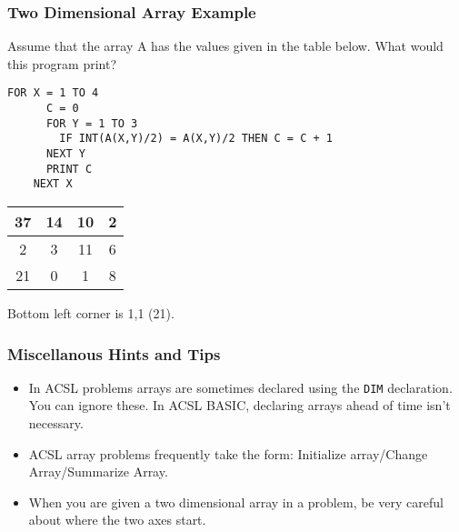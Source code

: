 \documentclass[handout,fleqn, t]{beamer}
\begin{document}
\begin{frame}[fragile]
  \frametitle{Two Dimensional Array Example}

  Assume that the array A has the values given in the table below.  What would
  this program print?

  \begin{lstlisting}[gobble=4]
    FOR X = 1 TO 4
      C = 0
      FOR Y = 1 TO 3
        IF INT(A(X,Y)/2) = A(X,Y)/2 THEN C = C + 1
      NEXT Y
      PRINT C
    NEXT X
  \end{lstlisting}
  \begin{tabular}{|c|c|c|c|}
    \hline 37 & 14 & 10 & 2 \\
    \hline 2 & 3 & 11 & 6 \\
    \hline 21 & 0 & 1 & 8 \\
    \hline
  \end{tabular}

  Bottom left corner is 1,1 (21).
\end{frame}

\begin{frame}
  \frametitle{Miscellanous Hints and Tips}
  \begin{itemize}
    \item In ACSL problems arrays are sometimes declared using the
      \lstinline{DIM} declaration.  You can ignore these.  In ACSL BASIC, declaring arrays ahead of time isn't necessary.
    \item ACSL array problems frequently take the form: Initialize array/Change
      Array/Summarize Array.
    \item When you are given a two dimensional array in a problem, be very
      careful about where the two axes start.
  \end{itemize}
\end{frame}
\end{document}
